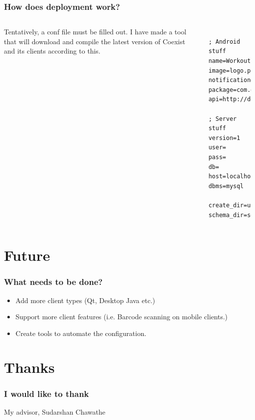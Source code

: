 \documentclass[]{beamer}
\begin{document}
\begin{frame}[fragile]
\frametitle{How does deployment work?}

\begin{columns}[c]
\column{1.6in}
Tentatively, a conf file must be filled out. I have made a tool that will download and compile the latest version of Coexist and its clients according to this.
\column{2.5in}
\begin{lstlisting}

; Android stuff
name=Workoutlog
image=logo.png
notification=notification.png
package=com.domain
api=http://domain.com:/api/

; Server stuff
version=1
user=
pass=
db=
host=localhost
dbms=mysql

create_dir=ui 
schema_dir=sql

\end{lstlisting}

\end{columns}


\end{frame}




\section{Future}

\begin{frame}
\frametitle{What needs to be done?}

\begin{itemize}
\item Add more client types (Qt, Desktop Java etc.)
\item Support more client features (i.e. Barcode scanning on mobile clients.)
\item Create tools to automate the configuration.
\end{itemize}

\end{frame}


\section{Thanks}

\begin{frame}
\frametitle{I would like to thank}

My advisor, Sudarshan Chawathe

\end{frame}
\end{document}
